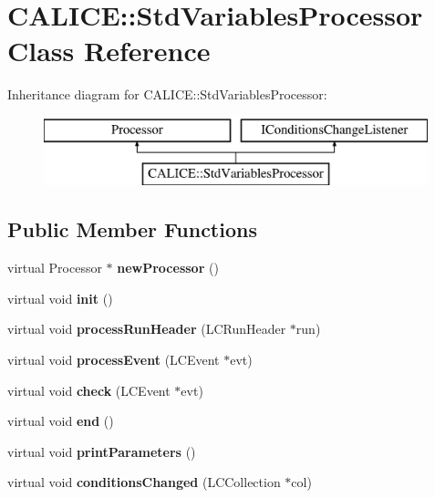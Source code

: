 \section{C\-A\-L\-I\-C\-E\-:\-:Std\-Variables\-Processor Class Reference}
\label{classCALICE_1_1StdVariablesProcessor}
Inheritance diagram for C\-A\-L\-I\-C\-E\-:\-:Std\-Variables\-Processor\-:\begin{figure}[H]
\begin{center}
\leavevmode
\includegraphics[height=2.000000cm]{classCALICE_1_1StdVariablesProcessor}
\end{center}
\end{figure}
\subsection*{Public Member Functions}
\begin{DoxyCompactItemize}
\item 
virtual Processor $\ast$ {\bfseries new\-Processor} ()\label{classCALICE_1_1StdVariablesProcessor_aa96a51dd44cc70d52fcd1df10a55f331}

\item 
virtual void {\bfseries init} ()\label{classCALICE_1_1StdVariablesProcessor_abe716dde8244653669e7c4990eab105c}

\item 
virtual void {\bfseries process\-Run\-Header} (L\-C\-Run\-Header $\ast$run)\label{classCALICE_1_1StdVariablesProcessor_a75e89ae7de63ceddc90cf7d1284c2dae}

\item 
virtual void {\bfseries process\-Event} (L\-C\-Event $\ast$evt)\label{classCALICE_1_1StdVariablesProcessor_a4ea9c975b691ae469f446c9d3f36fd42}

\item 
virtual void {\bfseries check} (L\-C\-Event $\ast$evt)\label{classCALICE_1_1StdVariablesProcessor_ad1643b0238a809f4f7d7bba4015d28b1}

\item 
virtual void {\bfseries end} ()\label{classCALICE_1_1StdVariablesProcessor_a8e967ab99bb311497528e77b70f5a446}

\item 
virtual void {\bfseries print\-Parameters} ()\label{classCALICE_1_1StdVariablesProcessor_afded2068fe77768100f667b0726bc4ca}

\item 
virtual void {\bfseries conditions\-Changed} (L\-C\-Collection $\ast$col)\label{classCALICE_1_1StdVariablesProcessor_a87d58f394dd0abf0c881ceed6625b3b8}

\end{DoxyCompactItemize}
